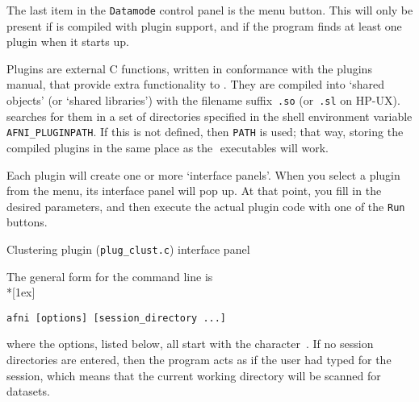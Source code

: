 The last item in the {\tt Datamode} control panel is the
 menu button.  This will only be present
if \afnit is compiled with plugin support, and if the
program finds at least one plugin when it starts up.

Plugins are external C functions, written in conformance
with the plugins manual, that provide extra functionality
to \afni.  They are compiled into `shared objects' (or `shared libraries')
with the filename suffix~{\tt .so} (or~{\tt .sl} on HP-UX).
\afnit searches for them in a set of directories
specified in the shell environment variable
{\tt AFNI\_PLUGINPATH}.  If this is not defined, then
{\tt PATH} is used; that way, storing the compiled plugins in the
same place as the \MCW$\!$ \afnit executables will work.

Each plugin will create one or more `interface panels'.
When you select a plugin from the  menu,
its interface panel will pop up.  At that point, you
fill in the desired parameters, and then execute the actual
plugin code with one of the {\tt Run} buttons.
\vspace{2ex}\goodbreak\begin{samepage}
\centerline{\epsfxsize=4.5in}\vspace{1ex}
\centerline{\sf Clustering plugin ({\tt plug\_clust.c}) interface panel}
\end{samepage}\goodbreak

The general form for the \afnit command line is\\*[1ex]
\centerline{\tt afni [options] [session\_directory ...]}\vspace{1ex}
where the options, listed below, all start with the character~\kq{-}.
If no session directories are entered, then the program acts
as if the user had typed  for the session, which means
that the current working directory will be scanned for datasets.

